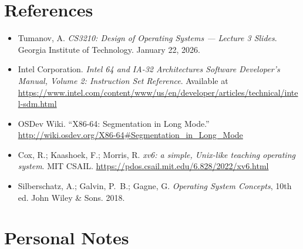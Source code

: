 \documentclass[11pt]{article}
\begin{document}
\section{References}

\begin{itemize}
    \item Tumanov, A. \textit{CS3210: Design of Operating Systems --- Lecture 3 Slides}.
          Georgia Institute of Technology. January 22, 2026.
    \item Intel Corporation. \textit{Intel 64 and IA-32 Architectures Software Developer's
          Manual, Volume 2: Instruction Set Reference}. Available at
          \url{https://www.intel.com/content/www/us/en/developer/articles/technical/intel-sdm.html}
    \item OSDev Wiki. ``X86-64: Segmentation in Long Mode.''
          \url{http://wiki.osdev.org/X86-64\#Segmentation_in_Long_Mode}
    \item Cox, R.; Kaashoek, F.; Morris, R. \textit{xv6: a simple, Unix-like teaching
          operating system}. MIT CSAIL. \url{https://pdos.csail.mit.edu/6.828/2022/xv6.html}
    \item Silberschatz, A.; Galvin, P.~B.; Gagne, G. \textit{Operating System Concepts},
          10th ed. John Wiley \& Sons. 2018.
\end{itemize}

\section*{Personal Notes}
\end{document}
